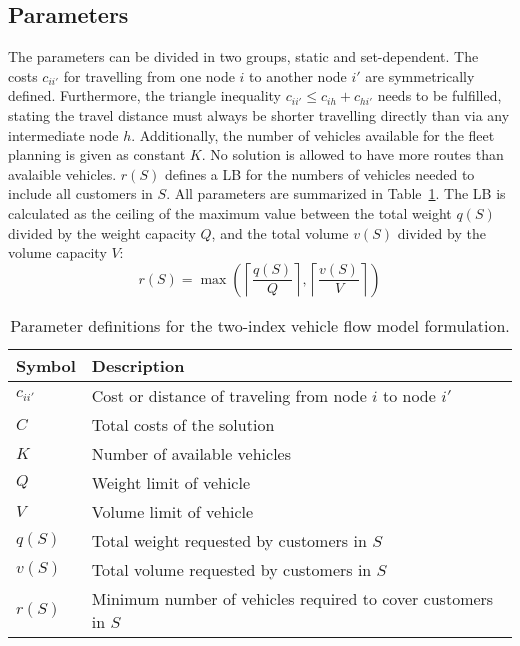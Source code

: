 \subsection*{Parameters}
The parameters can be divided in two groups, static and set-dependent.
The costs $c_{ii'}$ for travelling from one node $i$ to another node $i'$
are symmetrically defined. Furthermore, the triangle inequality
$c_{ii'} \leq c_{ih} + c_{hi'}$ needs to be fulfilled, stating the travel distance must always be shorter travelling
directly than via any intermediate node $h$. Additionally, the number of vehicles
available for the fleet planning is given as constant $K$. No solution is allowed to have
more routes than avalaible vehicles. $r(S)$ defines a \gls{LB} for the numbers of vehicles needed
to include all customers in $S$. All parameters are summarized in Table~\ref{tab:parameter_definitions}.
The \gls{LB} is calculated as the ceiling of the maximum
value between the total weight $q(S)$ divided by the weight capacity $Q$, and the
total volume $v(S)$ divided by the volume capacity $V$:
\[r(S) = \max\left( \left\lceil \frac{q(S)}{Q} \right\rceil, \left\lceil \frac{v(S)}{V} \right\rceil \right)\]
\begin{table}[ht]
	\centering
	\begin{tabular}{ll}
		\toprule
		Symbol    & Description                                                   \\
		\midrule
		$c_{ii'}$ & Cost or distance of traveling from node $i$ to node $i'$      \\
		$C$       & Total costs of the solution                                   \\
		$K$       & Number of available vehicles                                  \\
		$Q$       & Weight limit of vehicle                                       \\
		$V$       & Volume limit of vehicle                                       \\
		$q(S)$    & Total weight requested by customers in $S$                    \\
		$v(S)$    & Total volume requested by customers in $S$                    \\
		$r(S)$    & Minimum number of vehicles required to cover customers in $S$ \\
		\bottomrule
	\end{tabular}
	\caption{Parameter definitions for the two-index vehicle flow model formulation.}
	\label{tab:parameter_definitions}
\end{table}

